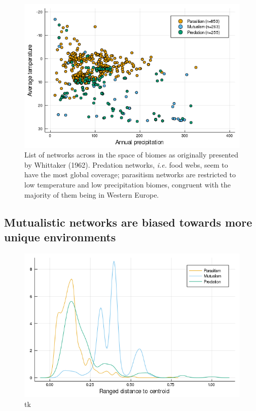 \begin{figure}
\centering
\includegraphics{figures/figure_02.png}
\caption{List of networks across in the space of biomes as originally
presented by Whittaker (1962). Predation networks, \emph{i.e.} food
webs, seem to have the most global coverage; parasitism networks are
restricted to low temperature and low precipitation biomes, congruent
with the majority of them being in Western Europe.\label{fig:biomes}}
\end{figure}

\hypertarget{mutualistic-networks-are-biased-towards-more-unique-environments}{%
\subsection{Mutualistic networks are biased towards more unique
environments}\label{mutualistic-networks-are-biased-towards-more-unique-environments}}

\begin{figure}
\centering
\includegraphics{figures/figure_05_b.png}
\caption{tk\label{fig:ecc}}
\end{figure}

